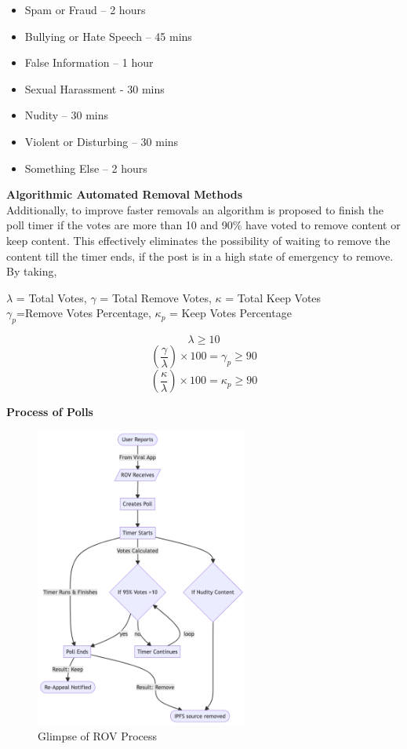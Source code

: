 \documentclass[letterpaper,11pt]{article}
\begin{document}
\begin{itemize}[wide, labelwidth=!, labelindent=0pt]
\item Spam or Fraud – 2 hours
\item Bullying or Hate Speech – 45 mins
\item False Information – 1 hour
\item Sexual Harassment - 30 mins
\item Nudity – 30 mins
\item Violent or Disturbing – 30 mins
\item Something Else – 2 hours
\end{itemize}

\textbf{Algorithmic Automated Removal Methods}\\

Additionally, to improve faster removals an algorithm is proposed to finish the poll timer if the votes are more than 10 and 90\% have voted to remove content or keep content. This effectively eliminates the possibility of waiting to remove the content till the timer ends, if the post is in a high state of emergency to remove. By taking,
\begin{center}
$\lambda$ = Total Votes, $\gamma$ = Total Remove Votes, $\kappa$ = Total Keep Votes \\
$\gamma_p$=Remove Votes Percentage, $\kappa_p$ = Keep Votes Percentage\\
\end{center}
\[\lambda \geq10\]
\[(\frac{\gamma}{\lambda}) \times  100 = \gamma_p \geq 90\]
\[(\frac{\kappa}{\lambda}) \times  100 = \kappa_p \geq 90\]

\textbf{Process of Polls}\\
\begin{figure}[H]
\begin{center}
\includegraphics[width=7cm]{rov-poll}
\caption{Glimpse of ROV Process}
\end{center}
\end{figure}
\end{document}
